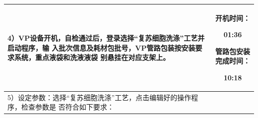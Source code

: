 \documentclass[UTF8,10pt,a4paper,fontset=fandol]{ctexart}
\newcommand{\fieldvalue}[1]{#1}
\newcommand{\handwritten}[1]{#1}
\begin{document}
\begin{tabularx}{\textwidth}{|X|c|}
\hline
\begin{minipage}[t]{0.96\linewidth}
\vspace{2pt}
4）VP设备开机，自检通过后，登录选择“复苏细胞洗涤”工艺并启动程序，输
入批次信息及耗材包批号，VP管路包装按安装要求系统，重点液袋和洗液液袋
别悬挂在对应支架上。
\vspace{4pt}
\end{minipage}
&
\begin{minipage}[t]{0.96\linewidth}
开机时间：

\fieldvalue{\handwritten{01:36}}

\vspace{8pt}
管路包安装完成时间：

\fieldvalue{\handwritten{10:18}}
\vspace{2pt}
\end{minipage}
\\
\hline
\begin{minipage}[t]{0.96\linewidth}
\vspace{2pt}
5）设定参数：选择“复苏细胞洗涤”工艺，点击编辑好的操作程序，检查参数是
否符合如下要求：


\end{minipage}
\end{tabularx}
\end{document}

